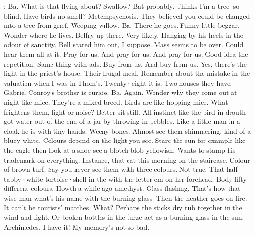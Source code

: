 \Bloom:
Ba.
What is that flying about?
Swallow?
Bat probably.
Thinks I'm a tree,
so blind.
Have birds
no smell?
Metempsychosis.
They believed
you could be changed into a tree
from grief.
Weeping willow.
Ba.
There he goes.
Funny little beggar.
Wonder where he lives.
Belfry up there.
Very likely.
Hanging by his heels
in the odour of sanctity.
Bell scared him out,
I suppose.
Mass seems to be over.
Could hear them all at it.
Pray for us.
And pray for us.
And pray for us.
Good idea the repetition.
Same thing with ads.
Buy from us.
And buy from us.
Yes,
there's the light
in the priest's house.
Their frugal meal.
Remember about the mistake in the valuation
when I was in Thom's.
Twenty·eight it is.
Two houses
they have.
Gabriel Conroy's brother is curate.
Ba.
Again.
Wonder why they come out at night
like mice.
They're a mixed breed.
Birds are
like hopping mice.
What frightens them,
light or noise?
Better sit still.
All instinct
like the bird in drouth
got water out of the end of a jar
by throwing in pebbles.
Like a little man in a cloak he is
with tiny hands.
Weeny bones.
Almost see them shimmering,
kind of a bluey white.
Colours depend on the light you see.
Stare the sun
for example
like the eagle
then look at a shoe
see a blotch blob yellowish.
Wants to stamp his trademark on everything.
Instance,
that cat this morning
on the staircase.
Colour of brown turf.
Say you never see them with three colours.
Not true.
That half tabby·white tortoise·shell
in the 
with the letter em on her forehead.
Body fifty different colours.
Howth
a while ago
amethyst.
Glass flashing.
That's how that wise man
what's his name
with the burning glass.
Then the heather goes on fire.
It can't be tourists' matches.
What?
Perhaps the sticks dry rub together
in the wind
and light.
Or broken bottles in the furze
act as a burning glass
in the sun.
Archimedes.
I have it!
My memory's not so bad.

